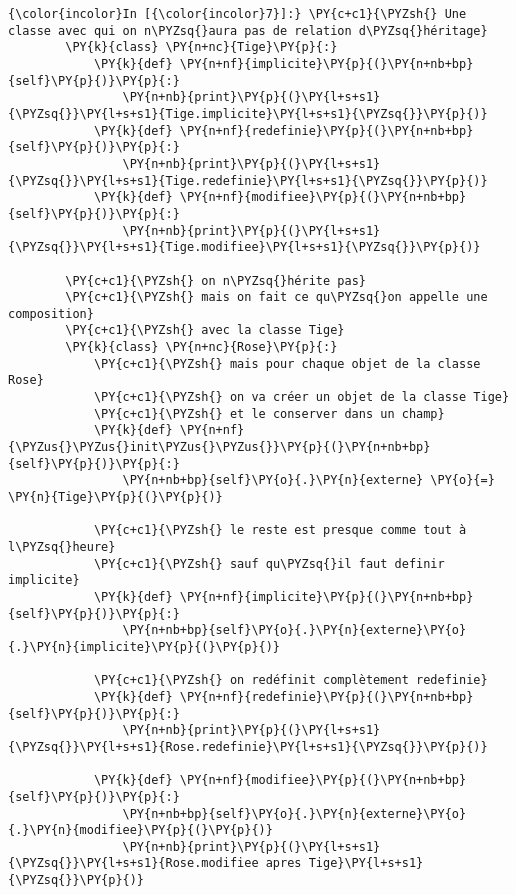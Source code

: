     \begin{Verbatim}[commandchars=\\\{\}]
{\color{incolor}In [{\color{incolor}7}]:} \PY{c+c1}{\PYZsh{} Une classe avec qui on n\PYZsq{}aura pas de relation d\PYZsq{}héritage}
        \PY{k}{class} \PY{n+nc}{Tige}\PY{p}{:}
            \PY{k}{def} \PY{n+nf}{implicite}\PY{p}{(}\PY{n+nb+bp}{self}\PY{p}{)}\PY{p}{:}
                \PY{n+nb}{print}\PY{p}{(}\PY{l+s+s1}{\PYZsq{}}\PY{l+s+s1}{Tige.implicite}\PY{l+s+s1}{\PYZsq{}}\PY{p}{)}
            \PY{k}{def} \PY{n+nf}{redefinie}\PY{p}{(}\PY{n+nb+bp}{self}\PY{p}{)}\PY{p}{:}
                \PY{n+nb}{print}\PY{p}{(}\PY{l+s+s1}{\PYZsq{}}\PY{l+s+s1}{Tige.redefinie}\PY{l+s+s1}{\PYZsq{}}\PY{p}{)}
            \PY{k}{def} \PY{n+nf}{modifiee}\PY{p}{(}\PY{n+nb+bp}{self}\PY{p}{)}\PY{p}{:}
                \PY{n+nb}{print}\PY{p}{(}\PY{l+s+s1}{\PYZsq{}}\PY{l+s+s1}{Tige.modifiee}\PY{l+s+s1}{\PYZsq{}}\PY{p}{)}
        
        \PY{c+c1}{\PYZsh{} on n\PYZsq{}hérite pas}
        \PY{c+c1}{\PYZsh{} mais on fait ce qu\PYZsq{}on appelle une composition}
        \PY{c+c1}{\PYZsh{} avec la classe Tige}
        \PY{k}{class} \PY{n+nc}{Rose}\PY{p}{:}
            \PY{c+c1}{\PYZsh{} mais pour chaque objet de la classe Rose}
            \PY{c+c1}{\PYZsh{} on va créer un objet de la classe Tige}
            \PY{c+c1}{\PYZsh{} et le conserver dans un champ}
            \PY{k}{def} \PY{n+nf}{\PYZus{}\PYZus{}init\PYZus{}\PYZus{}}\PY{p}{(}\PY{n+nb+bp}{self}\PY{p}{)}\PY{p}{:}
                \PY{n+nb+bp}{self}\PY{o}{.}\PY{n}{externe} \PY{o}{=} \PY{n}{Tige}\PY{p}{(}\PY{p}{)}
        
            \PY{c+c1}{\PYZsh{} le reste est presque comme tout à l\PYZsq{}heure}
            \PY{c+c1}{\PYZsh{} sauf qu\PYZsq{}il faut definir implicite}
            \PY{k}{def} \PY{n+nf}{implicite}\PY{p}{(}\PY{n+nb+bp}{self}\PY{p}{)}\PY{p}{:}
                \PY{n+nb+bp}{self}\PY{o}{.}\PY{n}{externe}\PY{o}{.}\PY{n}{implicite}\PY{p}{(}\PY{p}{)}
                
            \PY{c+c1}{\PYZsh{} on redéfinit complètement redefinie}
            \PY{k}{def} \PY{n+nf}{redefinie}\PY{p}{(}\PY{n+nb+bp}{self}\PY{p}{)}\PY{p}{:}
                \PY{n+nb}{print}\PY{p}{(}\PY{l+s+s1}{\PYZsq{}}\PY{l+s+s1}{Rose.redefinie}\PY{l+s+s1}{\PYZsq{}}\PY{p}{)}
                
            \PY{k}{def} \PY{n+nf}{modifiee}\PY{p}{(}\PY{n+nb+bp}{self}\PY{p}{)}\PY{p}{:}
                \PY{n+nb+bp}{self}\PY{o}{.}\PY{n}{externe}\PY{o}{.}\PY{n}{modifiee}\PY{p}{(}\PY{p}{)}
                \PY{n+nb}{print}\PY{p}{(}\PY{l+s+s1}{\PYZsq{}}\PY{l+s+s1}{Rose.modifiee apres Tige}\PY{l+s+s1}{\PYZsq{}}\PY{p}{)}
\end{Verbatim}


